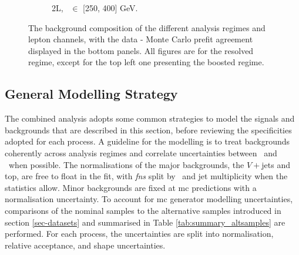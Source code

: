 \begin{figure}[h!]
{\begin{subfigure}[b]{0.37\textwidth}
            \caption{2L, \ptv\ $\in$ [250, 400] GeV.}
            \label{fig:backCom_2L_3}
        \end{subfigure} 
    }
    \caption{The background composition of the different analysis regimes and lepton channels, with the data - Monte Carlo prefit agreement displayed in the bottom panels. All figures are for the resolved regime, except for the top left one presenting the boosted regime.}
    \label{fig:backCom}
\end{figure} 

\subsection{General Modelling Strategy}\label{sec-modStrat}
The combined analysis adopts some common strategies to model the signals and backgrounds that are described in this section, before reviewing the specificities adopted for each process. A guideline for the modelling is to treat backgrounds coherently across analysis regimes and correlate uncertainties between \vhb\ and \vhc\ when possible. The normalisations of the major backgrounds, the $V+$jets and top, are free to float in the fit, with \textit{\glspl{fn}} split by \ptv\ and jet multiplicity when the statistics allow. Minor backgrounds are fixed at \gls{mc} predictions with a normalisation uncertainty. To account for \gls{mc} generator modelling uncertainties, comparisons of the nominal samples to the alternative samples introduced in section \ref{sec-datasets} and summarised in Table \ref{tab:summary_altsamples} are performed. For each process, the uncertainties are split into normalisation, relative acceptance, and shape uncertainties.  %

